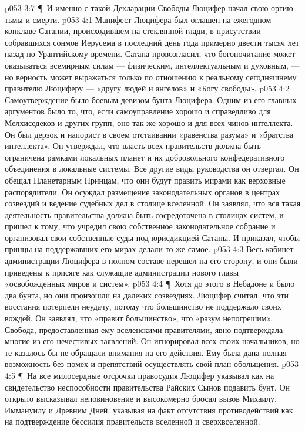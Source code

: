 \vs p053 3:7 \P\ И именно с такой Декларации Свободы Люцифер начал свою оргию тьмы и смерти.
\vs p053 4:1 Манифест Люцифера был оглашен на ежегодном конклаве Сатании, происходившем на стеклянной глади, в присутствии собравшихся сонмов Иерусема в последний день года примерно двести тысяч лет назад по Урантийскому времени. Сатана провозгласил, что богопочитание может оказываться всемирным силам --- физическим, интеллектуальным и духовным, --- но верность может выражаться только по отношению к реальному сегодняшнему правителю Люциферу --- «другу людей и ангелов» и «Богу свободы».
\vs p053 4:2 Самоутверждение было боевым девизом бунта Люцифера. Одним из его главных аргументов было то, что, если самоуправление хорошо и справедливо для Мелхиседеков и других групп, оно так же хорошо и для всех чинов интеллекта. Он был дерзок и напорист в своем отстаивании «равенства разума» и «братства интеллекта». Он утверждал, что власть всех правительств должна быть ограничена рамками локальных планет и их добровольного конфедеративного объединения в локальные системы. Все другие виды руководства он отвергал. Он обещал Планетарным Принцам, что они будут править мирами как верховные распорядители. Он осуждал размещение законодательных органов в центрах созвездий и ведение судебных дел в столице вселенной. Он заявлял, что вся такая деятельность правительства должна быть сосредоточена в столицах систем, и пришел к тому, что учредил свою собственное законодательное собрание и организовал свои собственные суды под юрисдикцией Сатаны. И приказал, чтобы принцы на поддержавших его мирах делали то же самое.
\vs p053 4:3 Весь кабинет администрации Люцифера в полном составе перешел на его сторону, и они были приведены к присяге как служащие администрации нового главы «освобожденных миров и систем».
\vs p053 4:4 \P\ Хотя до этого в Небадоне и было два бунта, но они произошли на далеких созвездиях. Люцифер считал, что эти восстания потерпели неудачу, потому что большинство не поддержало своих вождей. Он заявлял, что «правит большинство», что «разум непогрешим». Свобода, предоставленная ему вселенскими правителями, явно подтверждала многие из его нечестивых заявлений. Он игнорировал всех своих начальников, но те казалось бы не обращали внимания на его действия. Ему была дана полная возможность без помех и препятствий осуществлять свой план обольщения.
\vs p053 4:5 \P\ На все милосердные отсрочки правосудия Люцифер указывал как на свидетельство неспособности правительства Райских Сынов подавить бунт. Он открыто высказывал неповиновение и высокомерно бросал вызов Михаилу, Иммануилу и Древним Дней, указывая на факт отсутствия противодействий как на подтверждение бессилия правительств вселенной и сверхвселенной.
